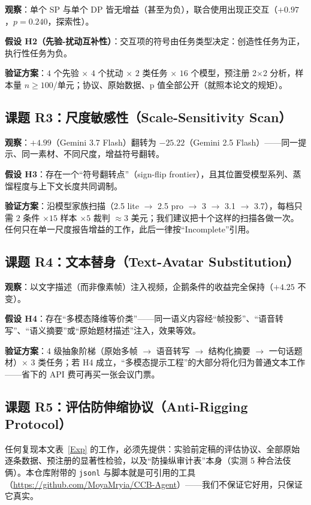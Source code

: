 \documentclass[journal]{IEEEtran}
\begin{document}
\textbf{观察}：单个 SP 与单个 DP 皆无增益（甚至为负），联合使用出现正交互（$+0.97$，$p=0.240$，探索性）。

\textbf{假设 H2（先验-扰动互补性）}：交互项的符号由任务类型决定：创造性任务为正，执行性任务为负。

\textbf{验证方案}：$4$ 个先验 $\times$ $4$ 个扰动 $\times$ $2$ 类任务 $\times$ $16$ 个模型，预注册 2$\times$2 分析，样本量 $n\ge100$/单元；协议、原始数据、p 值全部公开（就照本论文的规矩）。

\subsection*{课题 R3：尺度敏感性（Scale-Sensitivity Scan）}

\textbf{观察}：$+4.99$（Gemini 3.7 Flash）翻转为 $-25.22$（Gemini 2.5 Flash）——同一提示、同一素材、不同尺度，增益符号翻转。

\textbf{假设 H3}：存在一个“符号翻转点”（sign-flip frontier），且其位置受模型系列、蒸馏程度与上下文长度共同调制。

\textbf{验证方案}：沿模型家族扫描（2.5 lite $\to$ 2.5 pro $\to$ 3 $\to$ 3.1 $\to$ 3.7），每档只需 $2$ 条件 $\times 15$ 样本 $\times 5$ 裁判 $\approx 3$ 美元；我们建议把十个这样的扫描各做一次。任何只在单一尺度报告增益的工作，此后一律按“Incomplete”引用。

\subsection*{课题 R4：文本替身（Text-Avatar Substitution）}

\textbf{观察}：以文字描述（而非像素帧）注入视频，企鹅条件的收益完全保持（$+4.25$ 不变）。

\textbf{假设 H4}：存在“多模态降维等价类”——同一语义内容经“帧投影”、“语音转写”、“语义摘要”或“原始题材描述”注入，效果等效。

\textbf{验证方案}：4 级抽象阶梯（原始多帧 $\to$ 语音转写 $\to$ 结构化摘要 $\to$ 一句话题材）$\times$ 3 类任务；若 H4 成立，“多模态提示工程”的大部分将化归为普通文本工作——省下的 API 费可再买一张会议门票。

\subsection*{课题 R5：评估防伸缩协议（Anti-Rigging Protocol）}

任何复现本文表~\ref{Exp} 的工作，必须先提供：实验前定稿的评估协议、全部原始逐条数据、预注册的显著性检验，以及“防操纵审计表”本身（实测 5 种合法伎俩）。本仓库附带的 \texttt{jsonl} 与脚本就是可引用的工具（\url{https://github.com/MoyaMryia/CCB-Agent}）——我们不保证它好用，只保证它真实。
\end{document}

